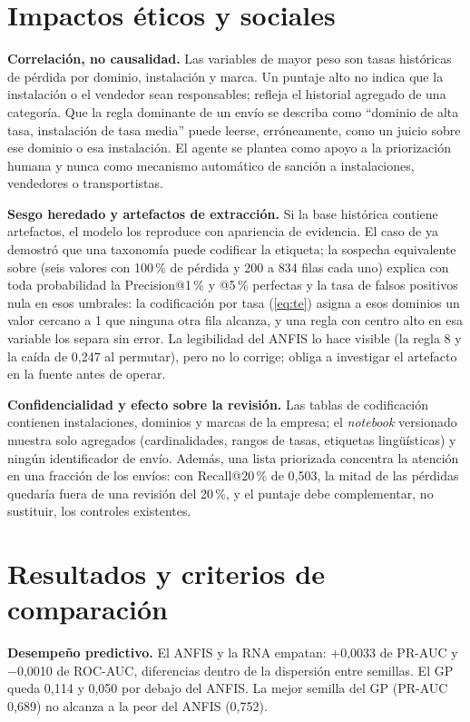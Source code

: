 \documentclass[conference]{IEEEtran}
\newcommand{\col}[1]{\texttt{\detokenize{#1}}}
\begin{document}
\section{Impactos éticos y sociales}

\textbf{Correlación, no causalidad.} Las variables de mayor peso son tasas
históricas de pérdida por dominio, instalación y marca. Un puntaje alto no
indica que la instalación o el vendedor sean responsables; refleja el
historial agregado de una categoría. Que la regla dominante de un envío se
describa como ``dominio de alta tasa, instalación de tasa media'' puede
leerse, erróneamente, como un juicio sobre ese dominio o esa instalación. El
agente se plantea como apoyo a la priorización humana y nunca como mecanismo
automático de sanción a instalaciones, vendedores o transportistas.

\textbf{Sesgo heredado y artefactos de extracción.} Si la base histórica
contiene artefactos, el modelo los reproduce con apariencia de evidencia. El
caso de \col{LG_REGION} ya demostró que una taxonomía puede codificar la
etiqueta; la sospecha equivalente sobre \col{DOM_DOMAIN_ID} (seis valores con
100\,\% de pérdida y 200 a 834 filas cada uno) explica con toda probabilidad
la Precision@1\,\% y @5\,\% perfectas y la tasa de falsos positivos nula en
esos umbrales: la codificación por tasa (\ref{eq:te}) asigna a esos dominios
un valor cercano a 1 que ninguna otra fila alcanza, y una regla con centro
alto en esa variable los separa sin error. La legibilidad del ANFIS lo hace
visible (la regla 8 y la caída de 0,247 al permutar), pero no lo corrige;
obliga a investigar el artefacto en la fuente antes de operar.

\textbf{Confidencialidad y efecto sobre la revisión.} Las tablas de
codificación contienen instalaciones, dominios y marcas de la empresa; el
\textit{notebook} versionado muestra solo agregados (cardinalidades, rangos
de tasas, etiquetas lingüísticas) y ningún identificador de envío. Además,
una lista priorizada concentra la atención en una fracción de los envíos:
con Recall@20\,\% de 0,503, la mitad de las pérdidas quedaría fuera de una
revisión del 20\,\%, y el puntaje debe complementar, no sustituir, los
controles existentes.

\section{Resultados y criterios de comparación}

\textbf{Desempeño predictivo.} El ANFIS y la RNA empatan: +0,0033 de PR-AUC y
$-$0,0010 de ROC-AUC, diferencias dentro de la dispersión entre semillas. El
GP queda 0,114 y 0,050 por debajo del ANFIS. La mejor semilla del GP (PR-AUC
0,689) no alcanza a la peor del ANFIS (0,752).
\end{document}
